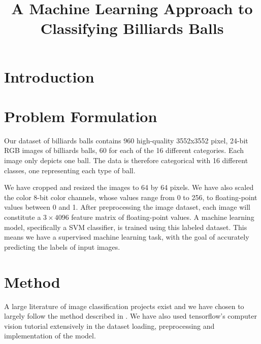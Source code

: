 \documentclass{article}
\begin{document}

\title{A Machine Learning Approach to Classifying Billiards Balls}
\maketitle

\section{Introduction}

\section{Problem Formulation}
\label{sec:problem_formulation}
Our dataset of billiards balls contains 960 high-quality 3552x3552 pixel, 24-bit RGB images of billiards balls, 60 for each of the 16 different categories. 
Each image only depicts one ball. The data is therefore categorical with 16 different classes, one representing each type of ball.


We have cropped and resized the images to 64 by 64 pixels. We have also scaled the color 8-bit color channels, whose values range from 0 to 256, 
to floating-point values between 0 and 1. After preprocessing the image dataset, each image will constitute a $3\times 4096$ feature matrix of floating-point values. 
A machine learning model, specifically a SVM classifier, is trained using this labeled dataset. This means we have a supervised machine learning task, with the goal of accurately 
predicting the labels of input images. 

\section{Method}
\label{sec:method}
A large literature of image classification projects exist and we have chosen to largely follow the method described in \cite{unknownMachineLearningApproach2023}.
We have also used tensorflow's computer vision tutorial extensively in the dataset loading, preprocessing and implementation of the model.\cite{ComputerVisionTensorFlow}
\end{document}
